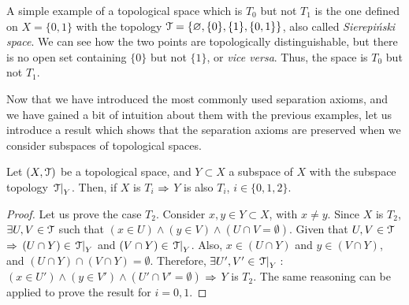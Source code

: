 \begin{example}
	A simple example of a topological space which is $T_0$ but not $T_1$ is the one defined on $X=\{0,1\}$ with the topology $\EuScript{T}=\{\varnothing, \{0\}, \{1\},\{0,1\}\}$, also called \emph{Sierepi\'{n}ski space}. We can see how the two points are topologically distinguishable, but there is no open set containing $\{0\}$ but not $\{1\}$, or \emph{vice versa}. Thus, the space is $T_0$ but not $T_1$.
\end{example}

Now that we have introduced the most commonly used separation axioms, and we have gained a bit of intuition about them with the previous examples, let us introduce a result which shows that the separation axioms are preserved when we consider subspaces of topological spaces.

\begin{theorem}
	\label{th:subspace-separation-consistency}
	Let $(X, \EuScript{T})$ be a topological space, and $Y\subset X$ a subspace of $X$ with the subspace topology $\left.\EuScript{T}\right|_{Y}$.
	Then, if $X$ is $T_i$ $\Rightarrow$ $Y$ is also $T_i$, $i\in\{0,1,2\}$.
\end{theorem}
\begin{proof}
	Let us prove the case $T_2$.
	Consider $x,y\in Y\subset X$, with $x\neq y$.
	Since $X$ is $T_2$, $\exists U,V\in\EuScript{T}$ such that $(x\in U)\land (y\in V)\land (U\cap V=\emptyset)$.
	Given that $U,V\in\EuScript{T}$ $\Rightarrow$ $(U\cap Y)\in \left.\EuScript{T}\right|_{Y}$ and $(V\cap Y)\in \left.\EuScript{T}\right|_{Y}$.
	Also, $x\in (U\cap Y)$ and $y\in (V\cap Y)$, and $(U\cap Y)\cap (V\cap Y)=\emptyset$.
	Therefore, $\exists U', V'\in \left.\EuScript{T}\right|_{Y}$\,:\,$(x\in U')\land (y\in V')\land (U'\cap V'=\emptyset)$ $\Rightarrow$ $Y$ is $T_2$.
	The same reasoning can be applied to prove the result for $i=0,1$.
\end{proof}

